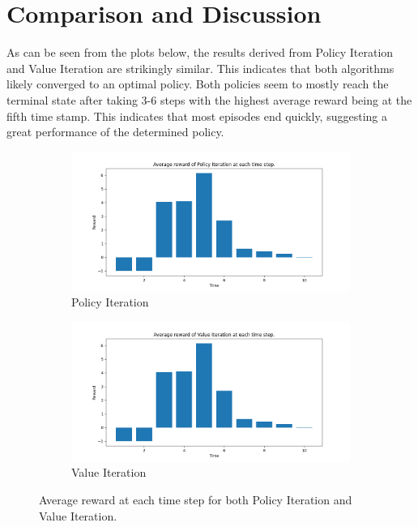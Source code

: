 \documentclass{class}
\begin{document}
\section{Comparison and Discussion}
\label{sec: comparison and discussion}
As can be seen from the plots below, the results derived from Policy Iteration and Value Iteration are strikingly similar. This indicates that both algorithms likely converged to an optimal policy. Both policies seem to mostly reach the terminal state after taking 3-6 steps with the highest average reward being at the fifth time stamp. This indicates that most episodes end quickly, suggesting a great performance of the determined policy.

\begin{figure}[H]
    \centering
    \begin{subfigure}[t]{0.48\linewidth}
        \centering
        \includegraphics[width=\linewidth]{plots/r_over_time/policy_iteration_r_over_time.png}
        \caption{Policy Iteration}
        \label{fig:policy_iteration_r_over_time}
    \end{subfigure}
    \hfill
    \begin{subfigure}[t]{0.48\linewidth}
        \centering
        \includegraphics[width=\linewidth]{plots/r_over_time/value_iteration_r_over_time.png}
        \caption{Value Iteration}
        \label{fig:value_iterations_r_over_time}
    \end{subfigure}
    \caption{Average reward at each time step for both Policy Iteration and Value Iteration.}
    \label{fig:DP_reward_comparison}
\end{figure}
\end{document}

